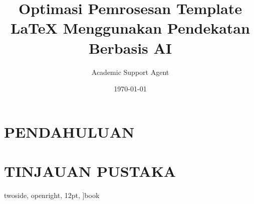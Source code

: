 \documentclass{book}
\title{Optimasi Pemrosesan Template LaTeX Menggunakan Pendekatan Berbasis AI}
\author{Academic Support Agent}
\date{\today}
\begin{document}
\maketitle

\begin{abstract}

\end{abstract}

\chapter{PENDAHULUAN}


\chapter{TINJAUAN PUSTAKA}


twoside,                %
openright,              %
12pt,                   %
]{book}
\end{document}
